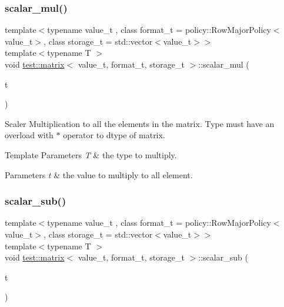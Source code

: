\subsubsection{\texorpdfstring{scalar\_mul()}{scalar\_mul()}}
{\footnotesize\ttfamily template$<$typename value\+\_\+t , class format\+\_\+t  = policy\+::\+Row\+Major\+Policy$<$value\+\_\+t$>$, class storage\+\_\+t  = std\+::vector$<$value\+\_\+t$>$$>$ \\
template$<$typename T $>$ \\
void \mbox{\hyperlink{classtest_1_1matrix}{test\+::matrix}}$<$ value\+\_\+t, format\+\_\+t, storage\+\_\+t $>$\+::scalar\+\_\+mul (\begin{DoxyParamCaption}\item[{T}]{t }\end{DoxyParamCaption})\hspace{0.3cm}{\ttfamily [inline]}}



Scaler Multiplication to all the elements in the matrix. Type must have an overload with $\ast$ operator to dtype of matrix. 


\begin{DoxyTemplParams}{Template Parameters}
{\em T} & the type to multiply. \\
\hline
\end{DoxyTemplParams}

\begin{DoxyParams}{Parameters}
{\em t} & the value to multiply to all element. \\
\hline
\end{DoxyParams}
\mbox{\label{classtest_1_1matrix_a65df8dc2b0c24cdc45e6063e9a779784}} 
\subsubsection{\texorpdfstring{scalar\_sub()}{scalar\_sub()}}
{\footnotesize\ttfamily template$<$typename value\+\_\+t , class format\+\_\+t  = policy\+::\+Row\+Major\+Policy$<$value\+\_\+t$>$, class storage\+\_\+t  = std\+::vector$<$value\+\_\+t$>$$>$ \\
template$<$typename T $>$ \\
void \mbox{\hyperlink{classtest_1_1matrix}{test\+::matrix}}$<$ value\+\_\+t, format\+\_\+t, storage\+\_\+t $>$\+::scalar\+\_\+sub (\begin{DoxyParamCaption}\item[{int}]{t }\end{DoxyParamCaption})\hspace{0.3cm}{\ttfamily [inline]}}



